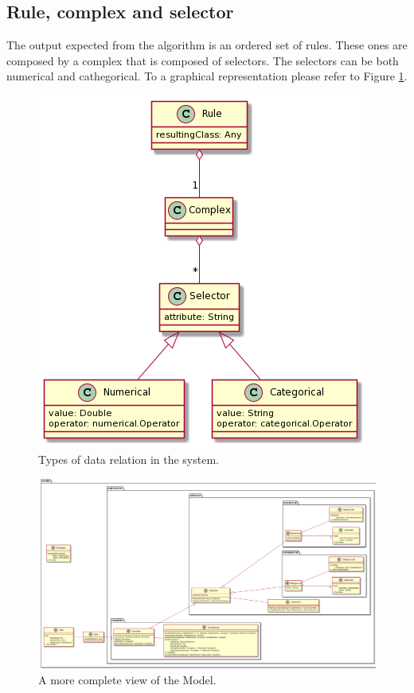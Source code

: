 \documentclass{article}
\begin{document}
\subsection{Rule, complex and selector}
The output expected from the algorithm is an ordered set of rules. These ones are composed by a complex that is composed of selectors. The selectors can be both numerical and cathegorical. To a graphical representation please refer to Figure \ref{figure:output_types}.
\begin{figure}[ht!]\centering
    \includegraphics[width=.6\textwidth]{pictures/output_types.png}
    \caption{Types of data relation in the system.}
    \label{figure:output_types}
\end{figure}

\begin{figure}[ht!]\centering
    \includegraphics[width=\textwidth]{pictures/model.png}
    \caption{A more complete view of the Model.}
    \label{figure:complete}
\end{figure}
\newpage
\end{document}

